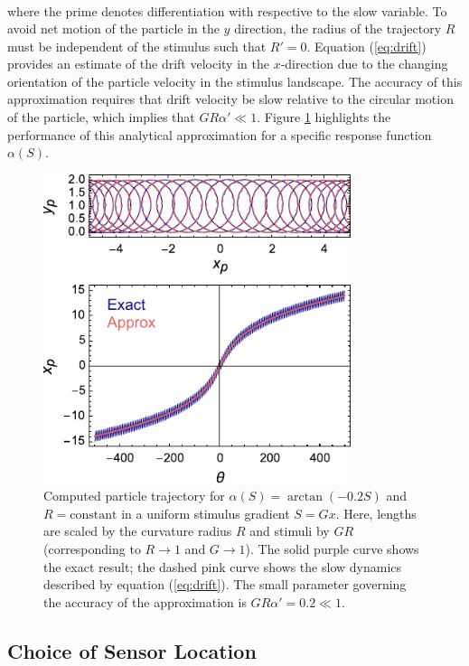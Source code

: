\begin{appendices}
\begin{align}
\end{align}
where the prime denotes differentiation with respective to the slow variable. To avoid net motion of the particle in the $y$ direction, the radius of the trajectory $R$ must be independent of the stimulus such that $R'=0$.  Equation (\ref{eq:drift}) provides an estimate of the drift velocity in the $x$-direction due to the changing orientation of the particle velocity in the stimulus landscape.  The accuracy of this approximation requires that drift velocity be slow relative to the circular motion of the particle, which implies that $G R\alpha' \ll 1$.  Figure \ref{fig:SimpleModel} highlights the performance of this analytical approximation for a specific response function $\alpha(S)$.
\begin{figure}[h]
    \centering
    \includegraphics[width=9cm]{figures/A3_SimpleModel.pdf}
    \caption{Computed particle trajectory for $\alpha(S) = \arctan(-0.2 S)$ and $R=\text{constant}$ in a uniform stimulus gradient $S=G x$. Here, lengths are scaled by the curvature radius $R$ and stimuli by $GR$ (corresponding to $R\rightarrow1$ and $G\rightarrow1$). The solid purple curve shows the exact result; the dashed pink curve shows the slow dynamics described by equation (\ref{eq:drift}). The small parameter governing the accuracy of the approximation is $G R\alpha' = 0.2 \ll 1$.}
    \label{fig:SimpleModel}
\end{figure}


\subsection{Choice of Sensor Location}


\end{appendices}
